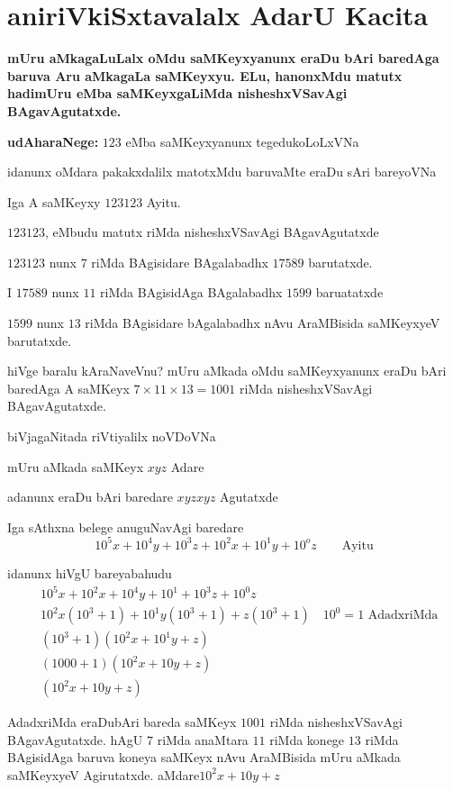 \chapter{aniriVkiSxtavalalx AdarU Kacita}
\vskip -20pt

{\bf mUru aMkagaLuLalx oMdu saMKeyxyanunx eraDu bAri baredAga baruva Aru aMkagaLa saMKeyxyu. ELu, hanonxMdu matutx hadimUru eMba saMKeyxgaLiMda nisheshxVSavAgi BAga\-vAgutatxde.}

\textbf{udAharaNege:} $123$ eMba saMKeyxyanunx tegedukoLoLxVNa

idanunx oMdara pakakxdalilx matotxMdu baruvaMte eraDu sAri bareyoVNa

Iga A saMKeyxy $123123$ Ayitu.

$123123$, eMbudu {} matutx {} riMda nisheshxVSavAgi BAgavAgutatxde

$123123$ nunx $7$ riMda BAgisidare BAgalabadhx $17589$ barutatxde.

I $17589$ nunx $11$ riMda BAgisidAga BAgalabadhx $1599$ baruatatxde

$1599$ nunx $13$ riMda BAgisidare bAgalabadhx nAvu AraMBisida saMKeyxyeV barutatxde.

hiVge baralu kAraNaveVnu? mUru aMkada oMdu saMKeyxyanunx eraDu bAri baredAga A saMKeyx $7\times 11 \times 13 = 1001$ riMda nisheshxVSavAgi BAgavAgutatxde.

biVjagaNitada riVtiyalilx noVDoVNa

mUru aMkada saMKeyx $xyz$ Adare

adanunx eraDu bAri baredare $xyzxyz$ Agutatxde

Iga sAthxna belege anuguNavAgi baredare
$$
10^5x+10^4y+10^3z+10^2x+10^1y+10^{o}z \qquad\text{Ayitu}
$$

idanunx hiVgU bareyabahudu
\begin{align*}
&10^{5}x+10^{2}x+10^{4}y+10^1+10^{3}z+10^{0}z\\
&10^{2}x\left(10^3+1\right) + 10^{1}y\left(10^3+1\right) + z\left(10^3 + 1\right) \quad\text{$10^0 = 1$ AdadxriMda}\\
&\left(10^3+1\right)\left(10^{2}x + 10^1{y} + z\right)\\
&(1000+1)\left(10^{2}x+10y+z\right)\\
&\left(10^{2}x +10y +z\right)
\end{align*}

AdadxriMda eraDubAri bareda saMKeyx $1001$ riMda nisheshxVSavAgi BAgavAgutatxde. hAgU $7$ riMda anaMtara $11$ riMda konege $13$ riMda BAgisidAga baruva koneya saMKeyx nAvu AraMBisida mUru aMkada saMKeyxyeV Agirutatxde. aMdare\break $10^{2}x+10y+z$

